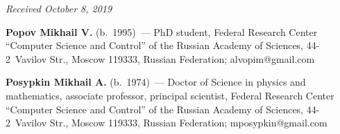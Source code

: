\vspace*{-6pt}

\hfill{\small\textit{Received October 8, 2019}}



\Contr

\noindent
\textbf{Popov Mikhail V.} (b.\ 1995)~--- PhD student, Federal Research Center 
``Computer Science and Control'' of the Russian Academy of Sciences, 44-2~Vavilov Str., Moscow 119333, 
Russian Federation; \mbox{alvopim@gmail.com}

\vspace*{3pt}

\noindent
\textbf{Posypkin Mikhail A.} (b.\ 1974)~--- 
Doctor of Science in physics and mathematics, associate professor, principal scientist, 
Federal Research Center ``Computer Science 
and Control'' of the Russian Academy of Sciences, 44-2~Vavilov 
Str., Moscow 119333, Russian Federation; \mbox{mposypkin@gmail.com}

\label{end\stat}

\renewcommand{\bibname}{\protect\rm Литература} 